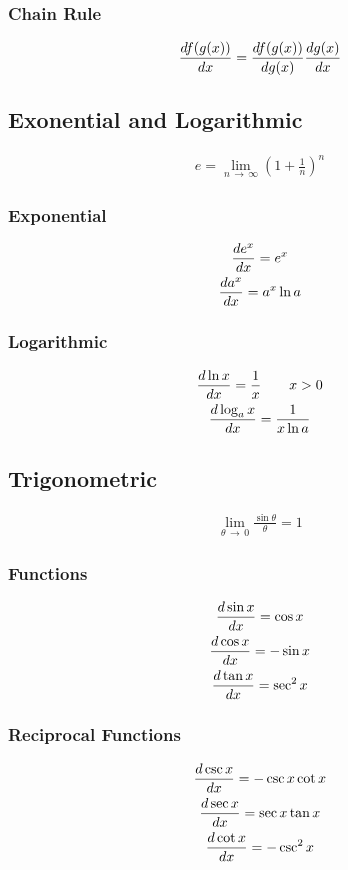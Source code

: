\documentclass[12pt]{article}
\numberwithin{equation}{subsubsection}
\begin{document}
			\subsubsection{Chain Rule}
				\begin{gather}
					\derivative{f(g(x))} =
					\derivative[g(x)]{f(g(x))}\derivative{g(x)}
				\end{gather}
		\subsection{Exonential and Logarithmic}
			\begin{gather}
				e = \lim_{n \,\to\, \infty} \left(1 +
				\frac{1}{n}\right)^n
			\end{gather}
			\subsubsection{Exponential}
				\begin{gather}
					\derivative{e^x} = e^x \\
					\derivative{a^x} = a^x\ln a
				\end{gather}
			\subsubsection{Logarithmic}
				\begin{gather}
					\derivative{\ln x} = \frac{1}{x} \qquad x > 0 \\
					\derivative{\log_ax} = \frac{1}{x\ln a}
				\end{gather}
		\subsection{Trigonometric}
			\begin{gather}
				\lim_{\theta \,\to\, 0} \frac{\sin \theta}{\theta} =
				1
			\end{gather}
			\subsubsection{Functions}
				\begin{gather}
					\derivative{\sin x} = \cos x \\
					\derivative{\cos x} = -\sin x \\
					\derivative{\tan x} = \sec^2 x
				\end{gather}
			\subsubsection{Reciprocal Functions}
				\begin{gather}
					\derivative{\csc x} = -\csc x \cot x \\
					\derivative{\sec x} = \sec x \tan x \\
					\derivative{\cot x} = -\csc^2 x
				\end{gather}
\end{document}
